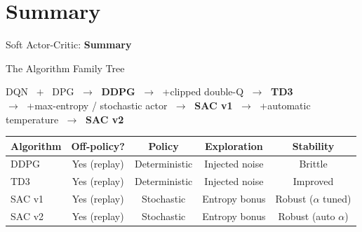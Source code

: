 \section{Summary}
\begin{frame}{}
    \LARGE Soft Actor-Critic: \textbf{Summary}
\end{frame}

\begin{frame}{The Algorithm Family Tree}
\begin{center}
DQN $\;+\;$ DPG $\;\rightarrow\;$ \textbf{DDPG} $\;\rightarrow\;$ +clipped double-Q $\;\rightarrow\;$ \textbf{TD3} \\[0.4em]
$\rightarrow\;$ +max-entropy / stochastic actor $\;\rightarrow\;$ \textbf{SAC v1} $\;\rightarrow\;$ +automatic temperature $\;\rightarrow\;$ \textbf{SAC v2}
\end{center}
\vspace{0.6em}
\begin{table}[]
    \centering
    \renewcommand{\arraystretch}{1.8}
    \small
    \begin{tabular}{lcccc}
        \hline
        \textbf{Algorithm} & \textbf{Off-policy?} & \textbf{Policy} & \textbf{Exploration} & \textbf{Stability} \\
        \hline
        DDPG     & Yes (replay) & Deterministic & Injected noise      & Brittle \\
        TD3      & Yes (replay) & Deterministic & Injected noise      & Improved \\
        SAC v1   & Yes (replay) & Stochastic    & Entropy bonus       & Robust ($\alpha$ tuned) \\
        SAC v2   & Yes (replay) & Stochastic    & Entropy bonus       & Robust (auto $\alpha$) \\
        \hline
    \end{tabular}
\end{table}
\end{frame}

